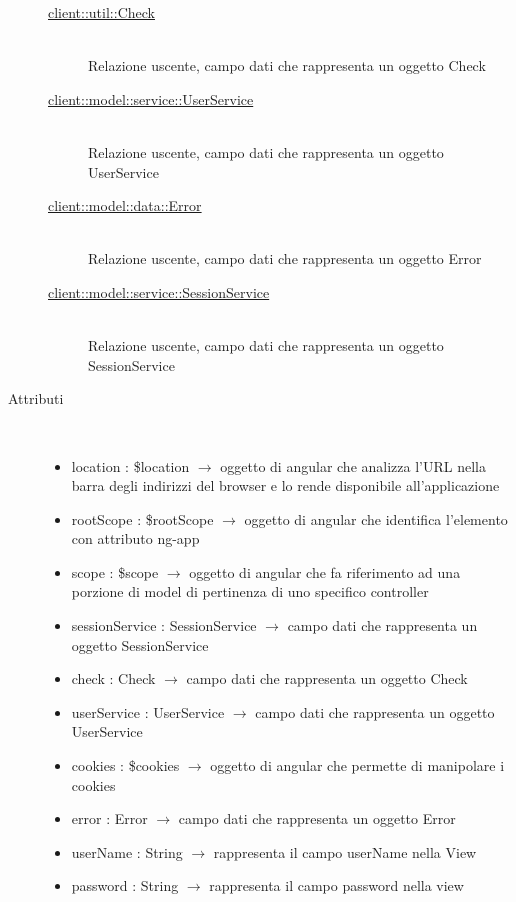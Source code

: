 \begin{description}
\begin{description}
	\item[\hyperlink{client::util::Check}{client::util::Check}] \hfill \\
	Relazione uscente, campo dati che rappresenta un oggetto Check
	\item[\hyperlink{client::model::service::UserService}{client::model::service::UserService}] \hfill \\
	Relazione uscente, campo dati che rappresenta un oggetto UserService
	\item[\hyperlink{client::model::data::Error}{client::model::data::Error}] \hfill \\
	Relazione uscente, campo dati che rappresenta un oggetto Error
	\item[\hyperlink{client::model::service::SessionService}{client::model::service::SessionService}] \hfill \\
	Relazione uscente, campo dati che rappresenta un oggetto SessionService
\end{description}

\item[Attributi] \hfill \\
\vspace{-7mm}
\begin{itemize}
	\item location : \$location $\rightarrow$ oggetto di angular che analizza l'URL nella barra degli indirizzi del browser e lo rende disponibile all'applicazione
	\item rootScope : \$rootScope $\rightarrow$ oggetto di angular che identifica l’elemento con attributo ng-app
	\item scope : \$scope $\rightarrow$ oggetto di angular che fa riferimento ad una porzione di model di pertinenza di uno specifico controller
	\item sessionService : SessionService $\rightarrow$ campo dati che rappresenta un oggetto SessionService
	\item check : Check $\rightarrow$ campo dati che rappresenta un oggetto Check
	\item userService : UserService $\rightarrow$ campo dati che rappresenta un oggetto UserService
	\item cookies : \$cookies $\rightarrow$ oggetto di angular che permette di manipolare i cookies
	\item error : Error $\rightarrow$ campo dati che rappresenta un oggetto Error
	\item userName : String $\rightarrow$ rappresenta il campo userName nella View
	\item password : String $\rightarrow$ rappresenta il campo password nella view
\end{itemize}


\end{description}
